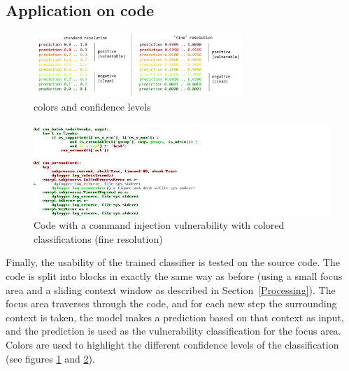 \documentclass[
a4paper,
pagesize,
pdftex,
12pt,
ngerman,
fleqn,
final,
]{scrartcl}
\begin{document}
	\subsection{Application on code}
	\begin{figure}[h]
		\centering
		\includegraphics[width=0.7\textwidth]{img/colorkey.png}
		\caption{colors and confidence levels}
		\label{fig:colors}
	\end{figure}
	
	\begin{figure}[h]
		\centering
		\includegraphics[width=1\textwidth]{img/exampleCommandInjection}
		\caption{Code with a command injection vulnerability with colored classifications (fine resolution)}
		\label{fig:example}
	\end{figure}
	Finally, the usability of the trained classifier is tested on the source code. The code is split into blocks in exactly the same way as before (using a small focus area and a sliding context window as described in Section~\ref{Processing}). The focus area traverses through the code, and for each new step the surrounding context is taken, the model makes a prediction based on that context as input, and the prediction is used as the vulnerability classification for the focus area. Colors are used to highlight the different confidence levels of the classification (see figures \ref{fig:colors} and \ref{fig:example}).\\	
	
\end{document}
